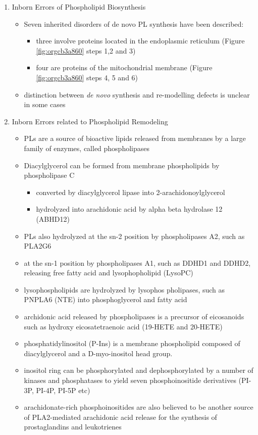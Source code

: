 \documentclass{scrartcl}
\begin{document}
\begin{enumerate}
\item Inborn Errors of Phospholipid Biosynthesis
\label{sec:org5d9cca6}
\begin{itemize}
\item Seven inherited disorders of de novo PL synthesis have been described:
\begin{itemize}
\item three involve proteins located in the endoplasmic reticulum
(Figure \ref{fig:orgcb3a860} steps 1,2 and 3)
\item four are proteins of the mitochondrial membrane (Figure
\ref{fig:orgcb3a860} steps 4, 5 and 6)
\end{itemize}
\item distinction between \emph{de novo} synthesis and re-modelling defects is
unclear in some cases
\end{itemize}

\item Inborn Errors related to Phospholipid Remodeling
\label{sec:orgfcd187e}
\begin{itemize}
\item PLs are a source of bioactive lipids released from
membranes by a large family of enzymes, called phospholipases
\item Diacylglycerol can be formed from membrane phospholipids by
phospholipase C
\begin{itemize}
\item converted by diacylglycerol lipase into 2-arachidonoylglycerol
\item hydrolyzed into arachidonic acid by alpha beta hydrolase 12 (ABHD12)
\end{itemize}
\item PLs also hydrolyzed at the sn-2 position by phospholipases A2, such
as PLA2G6
\item at the sn-1 position by phospholipases A1, such as DDHD1 and DDHD2,
releasing free fatty acid and lysophopholipid
(LysoPC)
\item lysophospholipids are hydrolyzed by lysophos pholipases, such as
PNPLA6 (NTE) into phosphoglycerol and fatty acid
\item archidonic acid released by phospholipases is a precursor of eicosanoids such as
hydroxy eicosatetraenoic acid (19-HETE and 20-HETE)
\item phosphatidylinositol (P-Ins) is a membrane phospholipid composed of
diacylglycerol and a D-myo-inositol head group.
\item inositol ring can be phosphorylated and dephosphorylated by a number
of kinases and phosphatases to yield seven phosphoinositide
derivatives (PI-3P, PI-4P, PI-5P etc)
\item arachidonate-rich phosphoinositides are also believed to be another
source of PLA2-mediated arachidonic acid release for the synthesis
of prostaglandins and leukotrienes
\end{itemize}
\end{enumerate}
\end{document}
